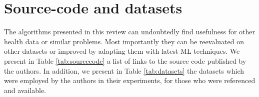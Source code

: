 \section{Source-code and datasets}
The algorithms presented in this review can undoubtedly find usefulness for other health data or similar problems. Most importantly they can be reevaluated on other datasets or improved by adapting them with latest ML techniques. We present in Table \ref{tab:sourcecode} a list of links to the source code published by the authors. In addition, we present in Table \ref{tab:datasets} the datasets which were employed by the authors in their experiments, for those who were referenced and available. 




